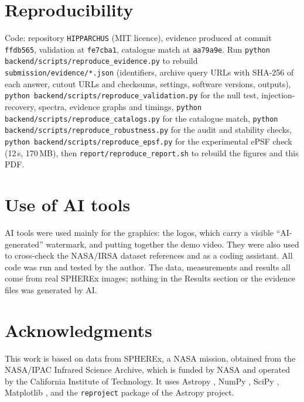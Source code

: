 \documentclass[11pt,a4paper]{article}
\begin{document}
\section{Reproducibility}
\sloppy %
Code: repository \texttt{HIPPARCHUS} (MIT licence), evidence produced at commit \texttt{ffdb565}, validation at \texttt{fe7cba1}, catalogue match at \texttt{aa79a9e}. Run
\texttt{python backend/scripts/reproduce\_evidence.py} to rebuild \texttt{submission/evidence/*.json} (identifiers,
archive query URLs with SHA-256 of each answer, cutout URLs and checksums, settings, software versions, outputs),
\texttt{python backend/scripts/reproduce\_validation.py} for the null test, injection-recovery, spectra, evidence
graphs and timings, \texttt{python backend/scripts/reproduce\_catalogs.py} for the catalogue match,
\texttt{python backend/scripts/reproduce\_robustness.py} for the audit and stability checks, \texttt{python backend/scripts/reproduce\_epsf.py} for the experimental ePSF check (12\,s, 170\,MB), then \texttt{report/reproduce\_report.sh} to rebuild the figures and this PDF.

\section*{Use of AI tools}
AI tools were used mainly for the graphics: the logos, which carry a visible ``AI-generated'' watermark, and
putting together the demo video. They were also used to cross-check the NASA/IRSA dataset references and as a coding
assistant. All code was run and tested by the author. The data, measurements and results all come from real SPHEREx
images; nothing in the Results section or the evidence files was generated by AI.

\section*{Acknowledgments}
This work is based on data from SPHEREx, a NASA mission, obtained from the NASA/IPAC Infrared Science Archive, which is
funded by NASA and operated by the California Institute of Technology. It uses Astropy
\parencite{astropy2013,astropy2018,astropy2022}, NumPy \parencite{numpy2020}, SciPy \parencite{scipy2020}, Matplotlib
\parencite{matplotlib2007}, and the \texttt{reproject} package of the Astropy project.

\printbibliography
\end{document}
